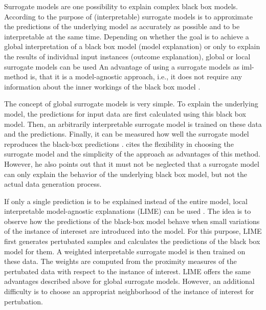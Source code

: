 Surrogate models are one possibility to explain complex black box models. According to \citet{Molnar.2019} the purpose of (interpretable) surrogate models is to approximate the predictions of the underlying model as accurately as possible and to be interpretable at the same time.
Depending on whether the goal is to achieve a global interpretation of a black box model (model explanation) or only to explain the results of individual input instances (outcome explanation), global or local surrogate models can be used \citep{.2021b}
An advantage of using a surrogate models as iml-method is, that it is a model-agnostic approach, i.e., it does not require any information about the inner workings of the black box model \citep{Molnar.2019}.

The concept of global surrogate models is very simple. To explain the underlying model, the predictions for input data are first calculated using this black box model. Then, an arbitrarily interpretable surrogate model is trained on these data and the predictions. Finally, it can be measured how well the surrogate model reproduces the black-box predictions \citep{Molnar.2019}. \citet{Molnar.2019} cites the flexibility in choosing the surrogate model and the simplicity of the approach as advantages of this method. However, he also points out that it must not be neglected that a surrogate model can only explain the behavior of the underlying black box model, but not the actual data generation process.

If only a single prediction is to be explained instead of the entire model, local interpretable model-agnostic explanations (LIME) can be used \citep{Ribeiro.2016}. The idea is to observe how the predictions of the black-box model behave when small variations of the instance of intereset are introduced into the model. For this purpose, LIME first generates pertubated samples and calculates the predictions of the black box model for them. A weighted interpretable surrogate model is then trained on these data. The weights are computed from the proximity measures of the pertubated data with respect to the instance of interest. 
LIME offers the same advantages described above for global surrogate models. However, an additional difficulty is to choose an appropriat neighborhood of the instance of interest for pertubation.
\citep{Molnar.2019}








